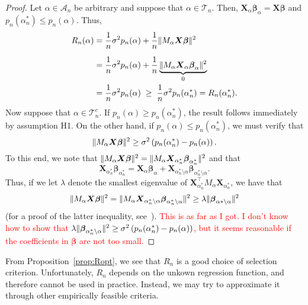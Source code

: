 \documentclass[12pt, letter paper]{article}
\newcommand{\1}{\mathmybb{1}}
\newcommand{\0}{\emptyset}
\newcommand{\paren}[1]{\left(#1 \right)}
\newcommand{\norm}[1]{|\hspace{-1pt}|#1 |\hspace{-1pt}|}
\newcommand{\normsq}[1]{\norm{#1}^{2}}
\newcommand{\Acal}{\mathcal{A}_{n}}
\newcommand{\Tcal}{\mathcal{T}_{n}}
\newcommand{\X}{\boldsymbol{X}}
\newcommand{\bbeta}{\boldsymbol{\beta}}
\begin{document}
\begin{proof}
    Let \(\alpha\in\Acal\) be arbitrary and suppose that \(\alpha\in\Tcal\). Then, \(\X_{\alpha}\bbeta_{\alpha} = \X\bbeta\) and \(p_{n}(\alpha_{n}^{*})\leq p_{n}(\alpha)\). Thus,
    \begin{align*}
        R_{n}(\alpha) &= \frac{1}{n}\sigma^{2}p_{n}(\alpha) + \frac{1}{n}\normsq{M_{\alpha}\X\bbeta}\\[2mm]
        &= \frac{1}{n} \sigma^{2}p_{n}(\alpha) + \frac{1}{n}\underbrace{\normsq{M_{\alpha}\X_{\alpha}\bbeta_{\alpha}}}_{0}\\
        &= \frac{1}{n}\sigma^{2}p_{n}(\alpha)\; \geq \; \frac{1}{n}\sigma^{2}p_{n}(\alpha_{n}^{*}) = R_{n}(\alpha_{n}^{*}).
    \end{align*}
    Now suppose that \(\alpha\in\Tcal^{c}\). If \(p_{n}(\alpha)\geq p_{n}(\alpha_{n}^{*})\), the result follows immediately by assumption H1. On the other hand, if \(p_{n}(\alpha)\leq p_{n}(\alpha_{n}^{*})\), we must verify that
    \begin{equation}\label{eq:Roptgoal}
        \normsq{M_{\alpha}\X\bbeta} \geq \sigma^{2}\paren{p_{n}(\alpha_{n}^{*}) - p_{n}(\alpha)}.
    \end{equation}
    To this end, we note that \(\normsq{M_{\alpha}\X\bbeta} = \normsq{M_{\alpha}\X_{\alpha_{n}^{*}}\bbeta_{\alpha_{n}^{*}}}\) and that 
    \[\X_{\alpha_{n}^{*}}\bbeta_{\alpha_{n}^{*}} = \X_{\alpha}\bbeta_{\alpha} + \X_{\alpha_{n}^{*}\setminus\alpha}\bbeta_{\alpha_{n}^{*}\setminus\alpha} .\]
    Thus, if we let \(\lambda\) denote the smallest eigenvalue of \(\X_{\alpha_{n}^{*}}^{\top}M_{\alpha}\X_{\alpha_{n}^{*}}\), we have that
    \[\normsq{M_{\alpha}\X\bbeta} = \normsq{M_{\alpha}\X_{\alpha_{n}^{*}\setminus\alpha}\bbeta_{\alpha_{n}^{*}\setminus\alpha}} \geq \lambda\normsq{\bbeta_{\alpha*\setminus\alpha}}\]
    (for a proof of the latter inequality, see~\cite{hansen_2022}).
    \textcolor{red}{This is as far as I got. I don't know how to show that \(\lambda\normsq{\bbeta_{\alpha_{n}^{*}\setminus\alpha}}\geq \sigma^{2}\paren{p_{n}(\alpha_{n}^{*}) - p_{n}(\alpha)}\), but it seems reasonable if the coefficients in \(\bbeta\) are not too small.}
\end{proof}

From Proposition~\ref{prop:Ropt}, we see that \(R_{n}\) is a good choice of selection criterion. Unfortunately, \(R_{n}\) depends on the unkown regression function, and therefore cannot be used in practice. Instead, we may try to approximate it through other empirically feasible criteria.
\end{document}
